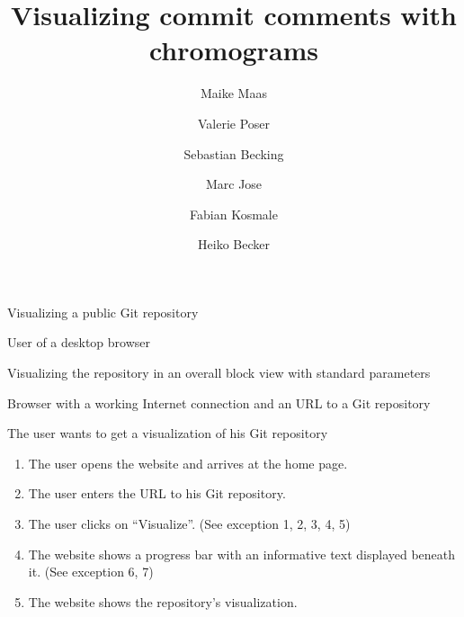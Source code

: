 \documentclass[11pt]{scrartcl}
\author{Maike Maas \and Valerie Poser \and Sebastian Becking \and
        Marc Jose \and Fabian Kosmale \and Heiko Becker}
\title{Visualizing commit comments with chromograms}
\begin{document}
\maketitle

\begin{description}[leftmargin=!,labelwidth=\widthof{\bfseries Frequency of use:}]
	\item[Use-case:] Visualizing a public Git repository 
	\item[Primary actor:] User of a desktop browser 
	\item[Goal in context:] Visualizing the repository in an overall block view with standard parameters 
	\item[Preconditions:] Browser with a working Internet connection and an URL to a Git repository
	\item[Trigger:] The user wants to get a visualization of his Git repository 

	\item[Scenario:]
		\begin{enumerate}[leftmargin=1.5em]
			\item The user opens the website and arrives at the home page.
			\item The user enters the URL to his Git repository. 
			\item The user clicks on \enquote{Visualize}. (See exception 1, 2, 3, 4, 5)
			\item The website shows a progress bar with an
				informative text displayed beneath
				it. (See exception 6, 7)
			\item The website shows the repository's visualization.
		\end{enumerate}
		

\end{description}
\end{document}
